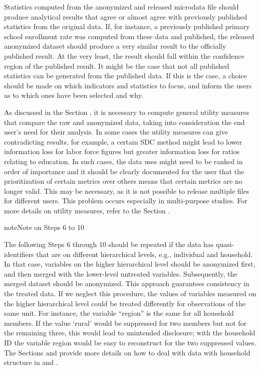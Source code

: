 \documentclass[letterpaper,10pt,english]{sphinxmanual}
\begin{document}
Statistics computed from the anonymized and released microdata file
should produce analytical results that agree or almost agree with
previously published statistics from the original data. If, for
instance, a previously published primary school enrollment rate was
computed from these data and published, the released anonymized dataset
should produce a very similar result to the officially published result.
At the very least, the result should fall within the confidence region
of the published result. It might be the case that not all published
statistics can be generated from the published data. If this is the
case, a choice should be made on which indicators and statistics to
focus, and inform the users as to which ones have been selected and why.

As discussed in the Section
,
it is necessary to compute general utility
measures that compare the raw and anonymized data, taking into
consideration the end user’s need for their analysis. In some cases the
utility measures can give contradicting results, for example, a certain
SDC method might lead to lower information loss for labor force figures
but greater information loss for ratios relating to education. In such
cases, the data uses might need to be ranked in order of importance and
it should be clearly documented for the user that the prioritization of
certain metrics over others means that certain metrics are no longer
valid. This may be necessary, as it is not possible to release multiple
files for different users. This problem occurs especially in
multi-purpose studies. For more details on utility measures, refer to
the Section .

\begin{sphinxadmonition}{note}{Note on Steps 6 to 10}

The following Steps 6 through 10 should be repeated if the data has
quasi-identifiers that are on different hierarchical levels, e.g.,
individual and household. In that case, variables on the higher
hierarchical level should be anonymized first, and then merged with the
lower-level untreated variables. Subsequently, the merged dataset should
be anonymized. This approach guarantees consistency in the treated data.
If we neglect this procedure, the values of variables measured on the
higher hierarchical level could be treated differently for observations
of the same unit. For instance, the variable “region” is the same for
all household members. If the value ‘rural’ would be suppressed for two
members but not for the remaining three, this would lead to unintended
disclosure; with the household ID the variable region would be easy to
reconstruct for the two suppressed values. The Sections
 and
 provide
more details on how to deal with data with household structure in 
and .
\end{sphinxadmonition}
\end{document}
